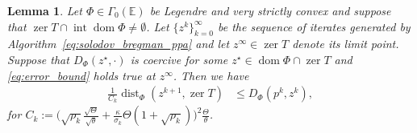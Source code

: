 \documentclass[11pt,onecolumn]{article}
\DeclareMathOperator{\dom}{dom}
\DeclareMathOperator{\intr}{int}
\DeclareMathOperator{\zer}{zer}
\DeclareMathOperator{\dist}{dist}
\newtheorem{lemma}[lemma]{Lemma}
\theoremstyle{remark}
\begin{document}
\begin{lemma}
    Let $\Phi\in \Gamma_0(\mathbb{E})$ be Legendre and very strictly convex and suppose that $\zer T \cap \intr\dom \Phi \neq \emptyset$.
    Let $\{z^k\}_{k=0}^\infty$ be the sequence of iterates generated by Algorithm~\ref{eq:solodov_bregman_ppa} and let $z^\infty \in \zer T$ denote its limit point. Suppose that $D_\Phi(z^\star, \cdot)$ is coercive for some $z^\star \in \dom \Phi \cap \zer T$ and \cref{eq:error_bound} holds true at $z^\infty$. 
    Then we have
    \begin{align}
 \tfrac{1}{C_k}\dist_\Phi(z^{k+1}, \zer T) &\leq D_\Phi(p^k, z^k),
    \end{align}
    for $C_k:=\big(\sqrt{\rho_k} \tfrac{\sqrt{\Theta}}{\sqrt{\theta}}+\tfrac{\kappa}{\sigma_k}\Theta(1+\sqrt{\rho_k})\big)^2 \tfrac{\Theta}{\theta}$.
\end{lemma}
\end{document}
